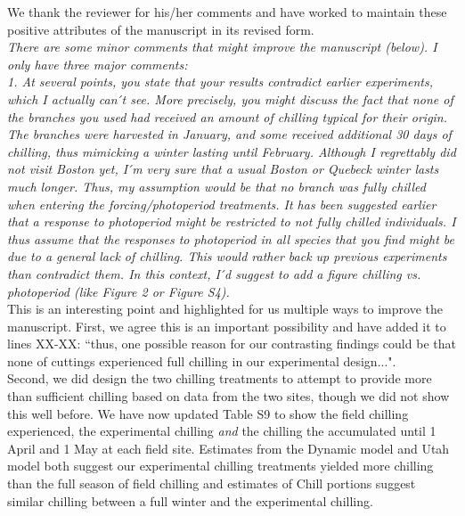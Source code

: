 \documentclass[11pt,a4paper]{article}
\begin{document}
We thank the reviewer for his/her comments and have worked to maintain these positive attributes of the manuscript in its revised form. \\

\emph{There are some minor comments that might improve the manuscript (below). I only have three
major comments:\\
1.      At several points, you state that your results contradict earlier experiments, which
I actually can ́t see. More precisely, you might discuss the fact that none of the branches
you used had received an amount of chilling typical for their origin. The branches were
harvested in January, and some received additional 30 days of chilling, thus mimicking a
winter lasting until February. Although I regrettably did not visit Boston yet, I ́m very sure
that a usual Boston or Quebeck winter lasts much longer. Thus, my assumption would be that no
branch was fully chilled when entering the forcing/photoperiod treatments. It has been
suggested earlier that a response to photoperiod might be restricted to not fully chilled
individuals. I thus assume that the responses to photoperiod in all species that you find
might be due to a general lack of chilling. This would rather back up previous experiments
than contradict them.
In this context, I ́d suggest to add a figure chilling vs. photoperiod (like Figure 2 or
Figure S4).}\\

This is an interesting point and highlighted for us multiple ways to improve the manuscript. First, we agree this is an important possibility and have added it to lines XX-XX: ``thus, one possible reason for our contrasting findings could be that none of cuttings experienced full chilling in our experimental design...".\\

Second, we did design the two chilling treatments to attempt to provide more than sufficient chilling based on data from the two sites, though we did not show this well before. We have now updated Table S9 to show the field chilling experienced, the experimental chilling \emph{and} the chilling the accumulated until 1 April and 1 May at each field site. Estimates from the Dynamic model and Utah model both suggest our experimental chilling treatments yielded more chilling than the full season of field chilling and estimates of Chill portions suggest similar chilling between a full winter and the experimental chilling. \\
\end{document}
